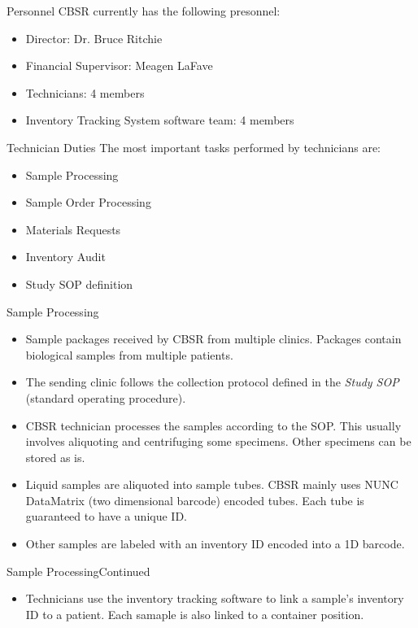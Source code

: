 \documentclass[hyperref={pdfpagelabels=false}]{beamer}
\begin{document}
\begin{frame}{Personnel}
  CBSR currently has the following presonnel:
  \begin{itemize}
    \item Director: Dr. Bruce Ritchie
    \item Financial Supervisor: Meagen LaFave
    \item Technicians: 4 members
    \item Inventory Tracking System software team: 4 members
  \end{itemize}
\end{frame}


\begin{frame}{Technician Duties}
  The most important tasks performed by technicians are:
  \begin{itemize}
    \item Sample Processing
    \item Sample Order Processing
    \item Materials Requests
    \item Inventory Audit
    \item Study SOP definition
  \end{itemize}
\end{frame}

\begin{frame}{Sample Processing}{}
  \begin{itemize}
    \item Sample packages received by CBSR from multiple clinics.
      Packages contain biological samples from multiple patients.
    \item The sending clinic follows the collection protocol defined in the
      \emph{Study SOP} (standard operating procedure).
    \item CBSR technician processes the samples according to the SOP. This
      usually involves aliquoting and centrifuging some specimens. Other
      specimens can be stored as is.
    \item Liquid samples are aliquoted into sample tubes. CBSR mainly uses NUNC
      DataMatrix (two dimensional barcode) encoded tubes. Each tube is
      guaranteed to have a unique ID.
    \item Other samples are labeled with an inventory ID encoded into a 1D
      barcode.
  \end{itemize}
\end{frame}

\begin{frame}{Sample Processing}{Continued}
  \begin{itemize}
    \item Technicians use the inventory tracking software to link a sample's
      inventory ID to a patient. Each samaple is also linked to a container
      position.
  \end{itemize}
\end{frame}
\end{document}
